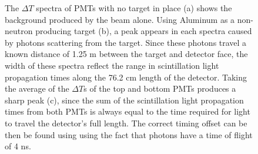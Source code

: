 \begin{figure}[htbp]
\begin{center}

\end{center}

\caption{The $\Delta T $ spectra of PMTs with no target in place (a) shows the background produced by the beam alone. Using Aluminum as a non-neutron producing target (b), a peak appears in each spectra caused by photons scattering from the target. Since these photons travel a known distance of 1.25 m between the target and detector face, the width of these spectra reflect the range in scintillation light propagation times along the 76.2 cm length of the detector. Taking the average of the $\Delta T$s of the top and bottom PMTs produces a sharp peak (c), since the sum of the scintillation light propagation times from both PMTs is always equal to the time required for light to travel the detector's full length. The correct timing offset can be then be found using using the fact that photons have a time of flight of 4 ns. }
\label{fig:ToFDetermination}
\end{figure}

